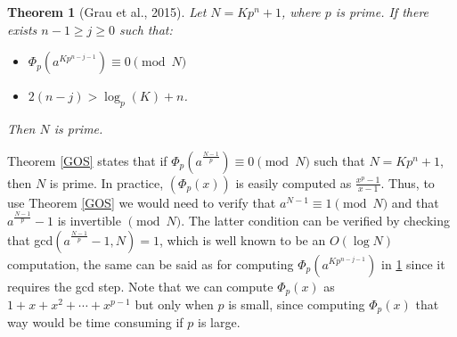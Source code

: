\documentclass{amsart}
\newtheorem{theorem}{Theorem}[section]
\numberwithin{equation}{section}
\begin{document}
\begin{theorem}[Grau et al.,  2015]\label{thmjose}
	Let $N=Kp^n+1$, where $p$ is prime. If there exists $n-1 \geq j \geq 0$ such that:
	\begin{itemize}
		\item[(i)]$\Phi_p(a^{Kp^{n-j-1}}) \equiv 0\pmod N $
		\item[(ii)]$2(n-j) > \log_p(K)+n$.
	\end{itemize} 
	Then $N$ is prime.
\end{theorem} 

Theorem \ref{GOS} states that if $\Phi_p(a^{\frac{N-1}{p}}) \equiv 0\pmod N$ such that $N=Kp^n+1$, then $N$ is prime. In practice, $(\Phi_p(x))$ is easily computed as $\frac{x^p-1}{x-1}$. Thus, to use Theorem \ref{GOS} we would need to verify that $a^{N-1} \equiv 1 \pmod N$ and that $a^{\frac{N-1}{p}}-1$ is invertible $\pmod N$. The latter condition can be verified by checking that gcd$(a^{\frac{N-1}{p}}-1,N)=1$, which is well known to be an $O(\log N)$ computation, the same can be said as for computing $\Phi_p(a^{Kp^{n-j-1}})$ in \ref{thmjose} since it requires the gcd step. Note that we can compute $\Phi_p(x)$ as $1+x+x^2+\cdots+x^{p-1}$ but only when $p$ is small, since computing $\Phi_p(x)$ that way would be time consuming if $p$ is large.
\end{document}
